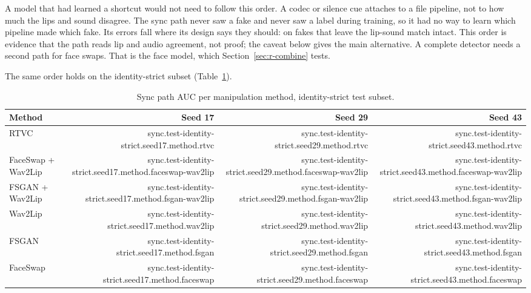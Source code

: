 A model that had learned a shortcut would not need to follow this order. A
codec or silence cue attaches to a file pipeline, not to how much the lips and
sound disagree. The sync path never saw a fake and never saw a label during
training, so it had no way to learn which pipeline made which fake. Its errors
fall where its design says they should: on fakes that leave the lip-sound
match intact. This order is evidence that the path reads lip and audio
agreement, not proof; the caveat below gives the main alternative. A complete
detector needs a second path for face swaps. That is the face model, which Section~\ref{sec:r-combine} tests.

The same order holds on the identity-strict subset
(Table~\ref{tab:sync-methods-strict}).

\begin{table}[ht]
    \centering
    \small
    \caption{Sync path AUC per manipulation method, identity-strict test subset.}
    \label{tab:sync-methods-strict}
    \begin{tabular}{l r r r}
        \toprule
        \textbf{Method} & \textbf{Seed 17} & \textbf{Seed 29} & \textbf{Seed 43} \\
        \midrule
        RTVC               & {{sync.test-identity-strict.seed17.method.rtvc}} & {{sync.test-identity-strict.seed29.method.rtvc}} & {{sync.test-identity-strict.seed43.method.rtvc}} \\
        FaceSwap + Wav2Lip & {{sync.test-identity-strict.seed17.method.faceswap-wav2lip}} & {{sync.test-identity-strict.seed29.method.faceswap-wav2lip}} & {{sync.test-identity-strict.seed43.method.faceswap-wav2lip}} \\
        FSGAN + Wav2Lip    & {{sync.test-identity-strict.seed17.method.fsgan-wav2lip}} & {{sync.test-identity-strict.seed29.method.fsgan-wav2lip}} & {{sync.test-identity-strict.seed43.method.fsgan-wav2lip}} \\
        Wav2Lip            & {{sync.test-identity-strict.seed17.method.wav2lip}} & {{sync.test-identity-strict.seed29.method.wav2lip}} & {{sync.test-identity-strict.seed43.method.wav2lip}} \\
        FSGAN              & {{sync.test-identity-strict.seed17.method.fsgan}} & {{sync.test-identity-strict.seed29.method.fsgan}} & {{sync.test-identity-strict.seed43.method.fsgan}} \\
        FaceSwap           & {{sync.test-identity-strict.seed17.method.faceswap}} & {{sync.test-identity-strict.seed29.method.faceswap}} & {{sync.test-identity-strict.seed43.method.faceswap}} \\
        \bottomrule
    \end{tabular}
\end{table}

